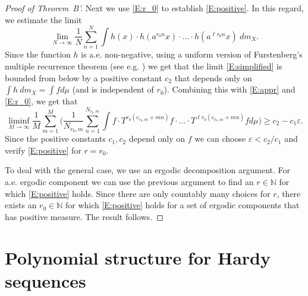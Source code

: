 \documentclass[11pt]{amsart}
\newcommand{\N}{\mathbb{N}}
\theoremstyle{plain}
\theoremstyle{definition}
\theoremstyle{remark}
\newtheorem*{remark}{Remark}
\begin{document}
\begin{proof}[Proof of Theorem~B']
Next we use \eqref{E:r_0} to establish \eqref{E:positive}. In this regard, we estimate the limit
\begin{equation}\label{E:simplified}
\lim_{N\to\infty}  \frac{1}{N}\sum_{n=1}^N  \int h(x) \cdot h(a^{r_0 n}x)
    \cdot\ldots\cdot h(a^{\ell r_0 n}x) \ dm_X.
  \end{equation}
Since the function $h$ is a.e. non-negative, using a uniform version of  Furstenberg's
multiple recurrence theorem (see e.g. \cite{BHRF}) we get that the limit \eqref{E:simplified}
is bounded from below by a positive constant $c_2$ that depends only
on $\int h\ dm_X=\int f d\mu$ (and is independent of $r_0$).  Combining this with \eqref{E:appr}
and \eqref{E:r_0}, we get that
$$
\liminf_{M\to\infty} \frac{1}{M}\sum_{m=1}^M\Big(\frac{1}{N_{r_0,m}}\sum_{n=1}^{N_{r_0,m}}
\int f \cdot T^{r_0(c_{r_0,m}+mn)}f \cdot\ldots\cdot T^{\ell
  r_0(c_{r_0,m}+mn)}f d\mu\Big) \geq c_2-c_1\varepsilon.
$$
Since the positive constants $c_1,c_2$ depend only on $f$ we can
choose $\varepsilon<c_2/c_1$ and verify \eqref{E:positive} for
$r=r_0$.


To deal with the general case, we use an ergodic decomposition argument. For a.e. ergodic component we can use the previous argument to find an $r\in \N$ for which \eqref{E:positive} holds. Since there are only countably many choices for $r$, there exists an $r_0\in \N$ for which  \eqref{E:positive} holds for a set of ergodic components that has positive measure.   The result follows.
\end{proof}



\section{Polynomial structure for Hardy
  sequences}\label{S:polypattern}
\end{document}
